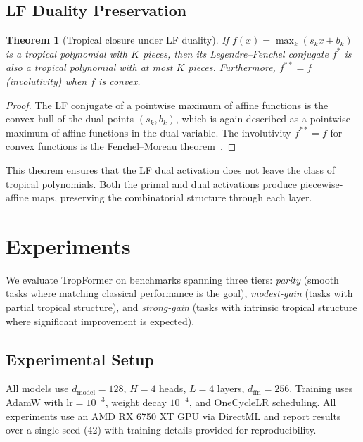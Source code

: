 \documentclass[11pt,twocolumn]{article}
\newtheorem{theorem}{Theorem}[section]
\begin{document}
\subsection{LF Duality Preservation}

\begin{theorem}[Tropical closure under LF duality]\label{thm:lf}
If $f(x) = \max_k(s_k x + b_k)$ is a tropical polynomial with $K$ pieces,
then its Legendre--Fenchel conjugate $f^*$ is also a tropical polynomial with
at most $K$ pieces. Furthermore, $f^{**} = f$ (involutivity) when $f$ is
convex.
\end{theorem}

\begin{proof}
The LF conjugate of a pointwise maximum of affine functions is the convex
hull of the dual points $(s_k, b_k)$, which is again described as a
pointwise maximum of affine functions in the dual variable. The involutivity
$f^{**} = f$ for convex functions is the Fenchel--Moreau
theorem~\cite{rockafellar1970convex}.
\end{proof}

This theorem ensures that the LF dual activation does not leave the class of
tropical polynomials. Both the primal and dual activations produce
piecewise-affine maps, preserving the combinatorial structure through each
layer.

\section{Experiments}\label{sec:experiments}

We evaluate TropFormer on benchmarks spanning three tiers:
\emph{parity} (smooth tasks where matching classical performance is the goal),
\emph{modest-gain} (tasks with partial tropical structure), and
\emph{strong-gain} (tasks with intrinsic tropical structure where significant
improvement is expected).

\subsection{Experimental Setup}

All models use $d_\text{model} = 128$, $H = 4$ heads, $L = 4$ layers,
$d_\text{ffn} = 256$. Training uses AdamW with $\text{lr} = 10^{-3}$,
weight decay $10^{-4}$, and OneCycleLR scheduling. All experiments use an
AMD RX 6750 XT GPU via DirectML and report results over a single seed (42)
with training details provided for reproducibility.
\end{document}
